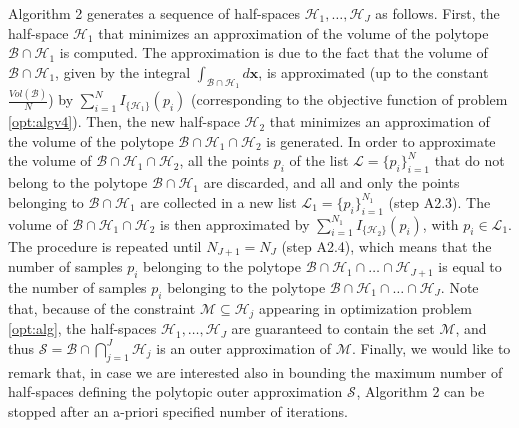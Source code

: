 \documentclass[twocolumn]{autart}
\newtheorem{remark}{Remark}{\normalfont}{\normalfont}
\newcommand{\DP}[1]{{#1}}
\begin{document}
Algorithm 2 generates a sequence of half-spaces $\mathcal{H}_1,\ldots, \mathcal{H}_J$ as follows. First, the half-space $\mathcal{H}_1$ that minimizes an approximation of the \DP{volume} of the polytope $\mathcal{B} \cap \mathcal{H}_1$ is computed. The approximation is due to the fact that the \DP{volume} of $\mathcal{B} \cap \mathcal{H}_1$, given by the integral $  \int_{\mathcal{B} \cap \mathcal{H}_1} d\mathbf{x} $, is approximated (up to the constant $\tfrac{Vol(\mathcal{B})}{N}$) by $ \sum_{i=1}^N I_{\{\mathcal{H}_1\}}(p_i)$ (corresponding to the objective function of problem \eqref{opt:algv4}). Then, the new half-space $\mathcal{H}_2$ that minimizes an approximation of the \DP{volume} of the polytope $\mathcal{B} \cap \mathcal{H}_1  \cap \mathcal{H}_2$ is generated. In order to approximate the \DP{volume} of $\mathcal{B} \cap \mathcal{H}_1  \cap \mathcal{H}_2$, all the points $p_i$ of the list $\mathcal{L}=\{p_i\}_{i=1}^N$ that do not belong to the polytope $\mathcal{B} \cap \mathcal{H}_1$ are discarded, and all and only the points belonging to $\mathcal{B} \cap \mathcal{H}_1$ are collected in a new list $\mathcal{L}_1=\{p_i\}_{i=1}^{N_1}$  (step A2.3).  The \DP{volume} of $\mathcal{B} \cap \mathcal{H}_1  \cap \mathcal{H}_2$  is then approximated by $  \sum_{i=1}^{N_1} I_{\{\mathcal{H}_2\}}(p_i)$, with $p_i \in \mathcal{L}_1$. The procedure is repeated until $N_{J+1}=N_{J}$ (step A2.4), which means that the number of samples $p_i$ belonging to the polytope $\mathcal{B} \cap \mathcal{H}_1 \cap \ldots \cap \mathcal{H}_{J+1}$ is equal to the number of samples $p_i$ belonging to the polytope $\mathcal{B} \cap \mathcal{H}_1 \cap \ldots \cap \mathcal{H}_{J}$. Note that, because of the constraint $\mathcal{M} \subseteq \mathcal{H}_j$ appearing in optimization problem \eqref{opt:alg}, the half-spaces $\mathcal{H}_1,\ldots, \mathcal{H}_J$ are guaranteed to contain the  set $\mathcal{M}$, and thus $ \mathcal{S}=\mathcal{B} \cap \bigcap_{j=1}^J\mathcal{H}_j$ is an outer approximation of $\mathcal{M}$.
Finally, we would like to remark that, in case we are interested also in bounding the maximum number of half-spaces 
defining the  polytopic outer approximation $\mathcal{S}^{}$, Algorithm 2 can be stopped after an a-priori specified 
number of iterations.

\end{document}
